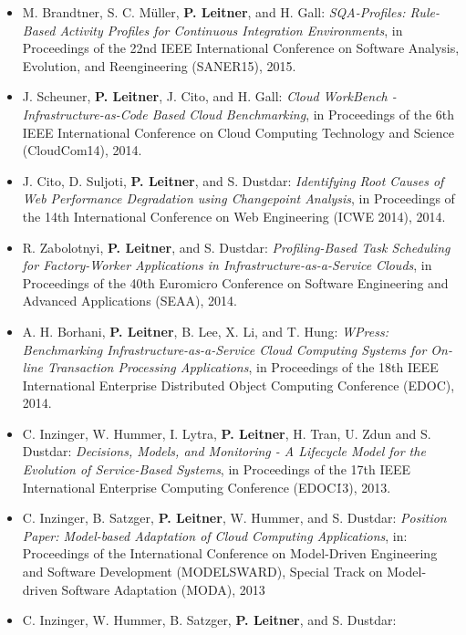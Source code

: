 \documentclass[paper=letter,fontsize=11pt]{scrartcl} %
\begin{document}
\begin{itemize}
on Program Comprehension (ICPC 2015), 2015. 
  \item M. Brandtner, S. C. M\"uller, \textbf{P. Leitner}, and H. Gall: \emph{SQA-Profiles: Rule-Based Activity Profiles for Continuous Integration Environments}, in Proceedings of the 22nd IEEE International Conference on Software Analysis, Evolution, and Reengineering (SANER15), 2015. 
  \item J. Scheuner, \textbf{P. Leitner}, J. Cito, and H. Gall: \emph{Cloud WorkBench - Infrastructure-as-Code Based Cloud Benchmarking}, in Proceedings of the 6th IEEE International Conference on Cloud Computing Technology and Science (CloudCom14), 2014. 
  \item J. Cito, D. Suljoti, \textbf{P. Leitner}, and S. Dustdar: \emph{Identifying Root Causes of Web Performance Degradation using Changepoint Analysis}, in Proceedings of the 14th International Conference on Web Engineering (ICWE 2014), 2014. 
 \item R. Zabolotnyi, \textbf{P. Leitner}, and S. Dustdar: \emph{Profiling-Based Task Scheduling for Factory-Worker Applications in Infrastructure-as-a-Service Clouds}, in Proceedings of the 40th Euromicro Conference on Software Engineering and Advanced Applications (SEAA), 2014. 
 \item A. H. Borhani, \textbf{P. Leitner}, B. Lee, X. Li, and T. Hung: \emph{WPress: Benchmarking Infrastructure-as-a-Service Cloud Computing Systems for On-line Transaction Processing Applications}, in Proceedings of the 18th IEEE International Enterprise Distributed Object Computing Conference (EDOC), 2014. 
\item C. Inzinger, W. Hummer, I. Lytra, \textbf{P. Leitner}, H. Tran, U. Zdun and S. Dustdar: \emph{Decisions, Models, and Monitoring - A Lifecycle Model for the Evolution of Service-Based Systems}, in Proceedings of the 17th IEEE International Enterprise Computing Conference (EDOC\'13), 2013. 
\item C. Inzinger, B. Satzger, \textbf{P. Leitner}, W. Hummer, and S. Dustdar:
\emph{Position Paper: Model-based Adaptation of Cloud Computing Applications},  in: Proceedings of the International Conference on Model-Driven Engineering and Software Development (MODELSWARD), Special Track on Model-driven Software Adaptation (MODA), 2013
\item C. Inzinger, W. Hummer, B. Satzger, \textbf{P. Leitner}, and S. Dustdar:

\end{itemize}
\end{document}
